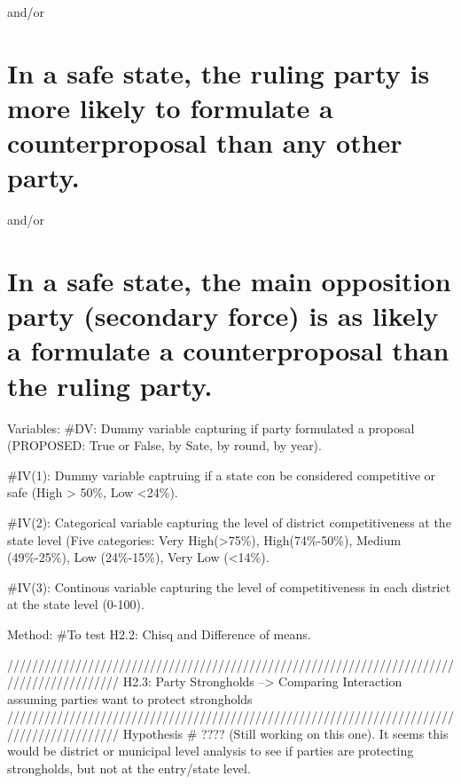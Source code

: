 \documentclass[
]{article}
\begin{document}
and/or

\hypertarget{in-a-safe-state-the-ruling-party-is-more-likely-to-formulate-a-counterproposal-than-any-other-party.}{%
\section{In a safe state, the ruling party is more likely to formulate a
counterproposal than any other
party.}\label{in-a-safe-state-the-ruling-party-is-more-likely-to-formulate-a-counterproposal-than-any-other-party.}}

and/or

\hypertarget{in-a-safe-state-the-main-opposition-party-secondary-force-is-as-likely-a-formulate-a-counterproposal-than-the-ruling-party.}{%
\section{In a safe state, the main opposition party (secondary force) is
as likely a formulate a counterproposal than the ruling
party.}\label{in-a-safe-state-the-main-opposition-party-secondary-force-is-as-likely-a-formulate-a-counterproposal-than-the-ruling-party.}}

Variables: \#DV: Dummy variable capturing if party formulated a proposal
(PROPOSED: True or False, by Sate, by round, by year).

\#IV(1): Dummy variable captruing if a state con be considered
competitive or safe (High \textgreater{} 50\%, Low \textless24\%).

\#IV(2): Categorical variable capturing the level of district
competitiveness at the state level (Five categories: Very
High(\textgreater75\%), High(74\%-50\%), Medium (49\%-25\%), Low
(24\%-15\%), Very Low (\textless14\%).

\#IV(3): Continous variable capturing the level of competitiveness in
each district at the state level (0-100).

Method: \#To test H2.2: Chisq and Difference of means.

//////////////////////////////////////////////////////////////////////////////////////////
H2.3: Party Strongholds --\textgreater{} Comparing Interaction assuming
parties want to protect strongholds
//////////////////////////////////////////////////////////////////////////////////////////
Hypothesis \# ???? (Still working on this one). It seems this would be
district or municipal level analysis to see if parties are protecting
strongholds, but not at the entry/state level.
\end{document}

